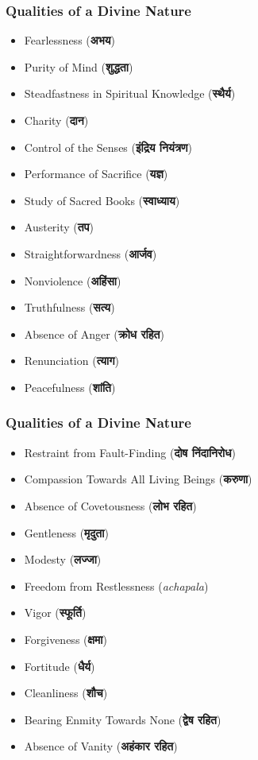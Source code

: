 \begin{frame}[fragile]\frametitle{Qualities of a Divine Nature}
    \begin{itemize}
        \item Fearlessness (\textbf{अभय})
        \item Purity of Mind (\textbf{शुद्धता})
        \item Steadfastness in Spiritual Knowledge (\textbf{स्थैर्य})
        \item Charity (\textbf{दान})
        \item Control of the Senses (\textbf{इंद्रिय नियंत्रण})
        \item Performance of Sacrifice (\textbf{यज्ञ})
        \item Study of Sacred Books (\textbf{स्वाध्याय})
        \item Austerity (\textbf{तप})
        \item Straightforwardness (\textbf{आर्जव})
        \item Nonviolence (\textbf{अहिंसा})
        \item Truthfulness (\textbf{सत्य})
        \item Absence of Anger (\textbf{क्रोध रहित})
        \item Renunciation (\textbf{त्याग})
        \item Peacefulness (\textbf{शांति})
    \end{itemize}
\end{frame}

\begin{frame}[fragile]\frametitle{Qualities of a Divine Nature}
    \begin{itemize}
        \item Restraint from Fault-Finding (\textbf{दोष निंदानिरोध})
        \item Compassion Towards All Living Beings (\textbf{करुणा})
        \item Absence of Covetousness (\textbf{लोभ रहित})
        \item Gentleness (\textbf{मृदुता})
        \item Modesty (\textbf{लज्जा})
        \item Freedom from Restlessness (\textit{achapala})
        \item Vigor (\textbf{स्फूर्ति})
        \item Forgiveness (\textbf{क्षमा})
        \item Fortitude (\textbf{धैर्य})
        \item Cleanliness (\textbf{शौच})
        \item Bearing Enmity Towards None (\textbf{द्वेष रहित})
        \item Absence of Vanity (\textbf{अहंकार रहित})
    \end{itemize}
\end{frame}



